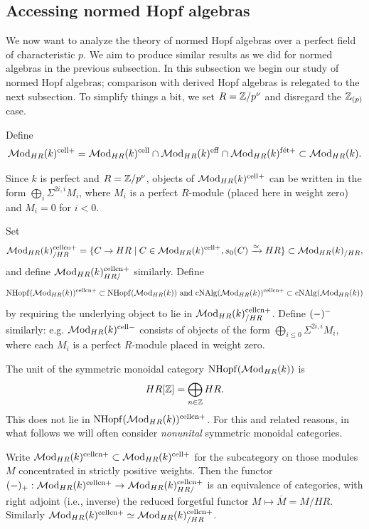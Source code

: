 \documentclass{amsart}
\numberwithin{proposition}{section}
\numberwithin{equation}{section}
\def\fet{\mathrm{f\acute et}}
\def\cell{\mathrm{cell}}
\def\NHopf{\mathrm{NHopf}}
\def\cNAlg{\mathrm{cNAlg}}
\def\cn{\mathrm{cn}}
\begin{document}
\subsection{Accessing normed Hopf algebras}
We now want to analyze the theory of normed Hopf algebras over a perfect field of characteristic $p$.
We aim to produce similar results as we did for normed algebras in the previous subsection.
In this subsection we begin our study of normed Hopf algebras; comparison with derived Hopf algebras is relegated to the next subsection.
To simplify things a bit, we set $R=\mathbb{Z}/p^\nu$ and disregard the $\mathbb{Z}_{(p)}$ case.

Define \[ \Mod_{HR}(k)^{\cell+} = \Mod_{HR}(k)^{\cell} \cap \Mod_{HR}(k)^{\eff} \cap \Mod_{HR}(k)^{\fet+} \subset \Mod_{HR}(k). \]

\begin{remark} \label{ref:Mod-cell+-explicit}
Since $k$ is perfect and $R=\mathbb{Z}/p^\nu$, objects of $\Mod_{HR}(k)^{\cell+}$ can be written in the form $\bigoplus_i \Sigma^{2i,i} M_i$, where $M_i$ is a perfect $R$-module (placed here in weight zero) and $M_i = 0$ for $i < 0$.
\end{remark}

Set \[ \Mod_{HR}(k)^{\cell\cn+}_{/HR} = \{ C \to HR \mid C \in \Mod_{HR}(k)^{\cell+}, s_0(C) \xrightarrow{\wequi} HR \} \subset \Mod_{HR}(k)_{/HR}, \] and define $\Mod_{HR}(k)^{\cell\cn+}_{HR/}$ similarly.
Define \[ \NHopf(\Mod_{HR}(k))^{\cell\cn+} \subset \NHopf(\Mod_{HR}(k)) \text{ and }  \cNAlg(\Mod_{HR}(k))^{\cell\cn+} \subset \cNAlg(\Mod_{HR}(k)) \] by requiring the underlying object to lie in $\Mod_{HR}(k)^{\cell\cn+}_{/HR}$.
Define $(\mathord-)^{-}$ similarly: e.g. $\Mod_{HR}(k)^{\cell-}$ consists of objects of the form $\bigoplus_{i \le 0} \Sigma^{2i,i} M_i$, where each $M_i$ is a perfect $R$-module placed in weight zero.

\begin{example}
The unit of the symmetric monoidal category $\NHopf(\Mod_{HR}(k))$ is \[ HR[\mathbb{Z}] = \bigoplus_{n \in \mathbb{Z}} HR. \]
This does not lie in $\NHopf(\Mod_{HR}(k))^{\cell\cn+}$.
For this and related reasons, in what follows we will often consider \emph{nonunital} symmetric monoidal categories.
\end{example}

\begin{remark}
Write $\Mod_{HR}(k)^{\cell\cn+} \subset \Mod_{HR}(k)^{\cell+}$ for the subcategory on those modules $M$ concentrated in strictly positive weights.
Then the functor $(\ph)_+: \Mod_{HR}(k)^{\cell\cn+} \to \Mod_{HR}(k)^{\cell\cn+}_{HR/}$ is an equivalence of categories, with right adjoint (i.e., inverse) the reduced forgetful functor $M \mapsto \overline{M} = M/HR$.
Similarly $\Mod_{HR}(k)^{\cell\cn+} \wequi \Mod_{HR}(k)^{\cell\cn+}_{/HR}$.
\end{remark}
\end{document}
